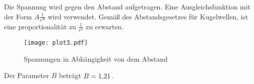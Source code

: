 Die Spannung wird gegen den Abstand aufgetragen. Eine Ausgleichsfunktion mit der Form $A \frac{1}{r^B}$ wird verwendet. Gemäß des
Abstandsgesetzes für Kugelwellen, ist eine proportionalität zu $\frac{1}{r^2}$ zu erwarten.

\begin{figure}[H]
  \centering
  \texttt{[image: plot3.pdf]}
  \caption{Spannungen in Abhängigkeit von dem Abstand}
  \label{fig:plot3}
\end{figure}

Der Parameter $B$ beträgt $B= \SI{1.2{1}}{}$.

